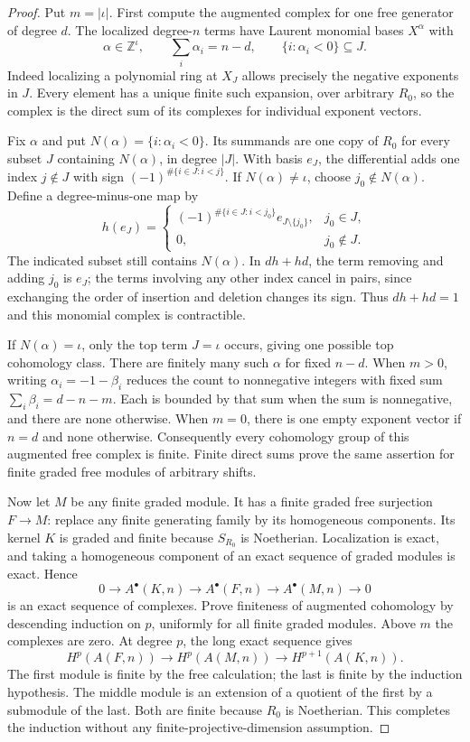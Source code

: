 \documentclass[11pt,a4paper]{article}
\numberwithin{equation}{section}
\theoremstyle{remark}\newtheorem{remark}[theorem]{Remark}
\begin{document}
\begin{proof}
Put $m=|\iota|$.  First compute the augmented complex for one
free generator of degree $d$.  The localized degree-$n$ terms
have Laurent monomial bases $X^\alpha$ with
\[
 \alpha\in\mathbb Z^{\iota},\qquad
 \sum_i\alpha_i=n-d,
 \qquad\{i:\alpha_i<0\}\subseteq J.
\]
Indeed localizing a polynomial ring at $X_J$ allows precisely
the negative exponents in $J$.  Every element has a unique finite
such expansion, over arbitrary $R_0$, so the complex is the
direct sum of its complexes for individual exponent vectors.

Fix $\alpha$ and put $N(\alpha)=\{i:\alpha_i<0\}$.
Its summands are one copy of $R_0$ for every subset $J$ containing
$N(\alpha)$, in degree $|J|$.  With basis $e_J$, the differential
adds one index $j\notin J$ with sign
$(-1)^{\#\{i\in J:i<j\}}$.
If $N(\alpha)\ne\iota$, choose $j_0\notin N(\alpha)$.
Define a degree-minus-one map by
\[
 h(e_J)=
 \begin{cases}
 (-1)^{\#\{i\in J:i<j_0\}}e_{J\setminus\{j_0\}},&j_0\in J,\\
 0,&j_0\notin J.
 \end{cases}
\]
The indicated subset still contains $N(\alpha)$.
In $dh+hd$, the term removing and adding $j_0$ is $e_J$;
the terms involving any other index cancel in pairs, since
exchanging the order of insertion and deletion changes its sign.
Thus $dh+hd=1$ and this monomial complex is contractible.

If $N(\alpha)=\iota$, only the top term $J=\iota$ occurs,
giving one possible top cohomology class.  There are finitely many
such $\alpha$ for fixed $n-d$.  When $m>0$, writing
$\alpha_i=-1-\beta_i$ reduces the count to nonnegative integers
with fixed sum $\sum_i\beta_i=d-n-m$.  Each is bounded by that
sum when the sum is nonnegative, and there are none otherwise.
When $m=0$, there is one empty exponent vector if $n=d$ and
none otherwise.  Consequently every cohomology group of this
augmented free complex is finite.  Finite direct sums prove the
same assertion for finite graded free modules of arbitrary shifts.

Now let $M$ be any finite graded module.  It has a finite graded
free surjection $F\to M$: replace any finite generating family
by its homogeneous components.  Its kernel $K$ is graded and
finite because $S_{R_0}$ is Noetherian.  Localization is exact,
and taking a homogeneous component of an exact sequence of
graded modules is exact.  Hence
\[
 0\longrightarrow A^\bullet(K,n)
 \longrightarrow A^\bullet(F,n)
 \longrightarrow A^\bullet(M,n)\longrightarrow0
\]
is an exact sequence of complexes.  Prove finiteness of augmented
cohomology by descending induction on $p$, uniformly for all
finite graded modules.  Above $m$ the complexes are zero.  At
degree $p$, the long exact sequence gives
\[
 H^p(A(F,n))\longrightarrow H^p(A(M,n))
 \longrightarrow H^{p+1}(A(K,n)).
\]
The first module is finite by the free calculation; the last is
finite by the induction hypothesis.  The middle module is an
extension of a quotient of the first by a submodule of the last.
Both are finite because $R_0$ is Noetherian.  This completes
the induction without any finite-projective-dimension assumption.


\end{proof}
\end{document}
